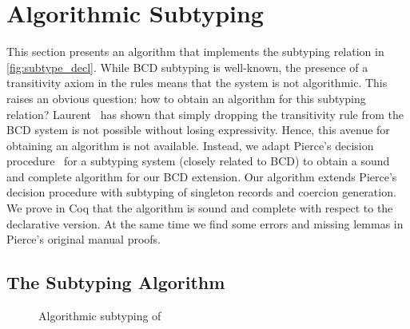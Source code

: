 
\section{Algorithmic Subtyping}
\label{sec:alg}

This section presents an algorithm that implements the subtyping relation in
\cref{fig:subtype_decl}. While BCD subtyping is well-known, the
presence of a transitivity axiom in the rules means that the system is
not algorithmic. This raises an obvious question: how to obtain an
algorithm for this subtyping relation? Laurent~\cite{Laurent12note} has shown that simply dropping
the transitivity rule from the BCD system is not possible without losing expressivity. Hence, this avenue for
obtaining an algorithm is not available. 
Instead, we adapt Pierce's decision
procedure~\cite{pierce1989decision} for a subtyping system (closely
related to BCD) to obtain a sound and complete algorithm for our
BCD extension. Our algorithm extends Pierce's decision
procedure with subtyping of singleton records and
coercion generation. We prove in Coq that the algorithm is sound and complete with
respect to the declarative version. At the same time we
find some errors and missing lemmas in Pierce's original manual proofs.




\subsection{The Subtyping Algorithm}

\begin{figure}[t]
  \centering
  \begin{small}
  \end{small}
  \caption{Algorithmic subtyping of \name}
  \label{fig:algorithm}
\end{figure}


